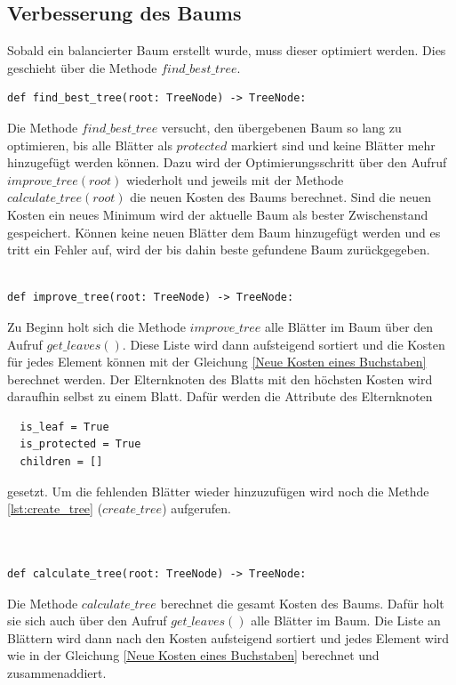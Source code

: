 \documentclass[a4paper,10pt,ngerman]{scrartcl}
\begin{document}
\subsection{Verbesserung des Baums}
Sobald ein balancierter Baum erstellt wurde, muss dieser optimiert werden. Dies geschieht über die Methode $find\_best\_tree$.
\vspace{2em}
\begin{lstlisting}[caption={Methode \texttt{find\_best\_tree}}, label={lst:find_best_tree}]
  def find_best_tree(root: TreeNode) -> TreeNode:
\end{lstlisting}
Die Methode $find\_best\_tree$ versucht, den übergebenen Baum so lang zu optimieren, bis alle Blätter als $protected$ markiert sind und keine Blätter mehr hinzugefügt werden können.
Dazu wird der Optimierungsschritt über den Aufruf $improve\_tree(root)$ wiederholt und jeweils mit der Methode $calculate\_tree(root)$ die neuen Kosten des Baums berechnet.
Sind die neuen Kosten ein neues Minimum wird der aktuelle Baum als bester Zwischenstand gespeichert.
Können keine neuen Blätter dem Baum hinzugefügt werden und es tritt ein Fehler auf, wird der bis dahin beste gefundene Baum zurückgegeben.\\
\\
\vspace{2em}
\begin{lstlisting}[caption={Methode \texttt{imporve\_tree}}, label={lst:imporve_tree}]
  def improve_tree(root: TreeNode) -> TreeNode:
\end{lstlisting}
Zu Beginn holt sich die Methode $improve\_tree$ alle Blätter im Baum über den Aufruf $get\_leaves()$.
Diese Liste wird dann aufsteigend sortiert und die Kosten für jedes Element können mit der Gleichung \eqref{Neue Kosten eines Buchstaben} berechnet werden.
Der Elternknoten des Blatts mit den höchsten Kosten wird daraufhin selbst zu einem Blatt. Dafür werden die Attribute des Elternknoten
\begin{lstlisting}
  is_leaf = True
  is_protected = True
  children = []
\end{lstlisting}
\vspace{-1.5em}
gesetzt. Um die fehlenden Blätter wieder hinzuzufügen wird noch die Methde \ref{lst:create_tree}  ($create\_tree$) aufgerufen.\\
\\\\
\begin{lstlisting}[caption={Methode \texttt{calculate\_tree}}, label={lst:calculate_tree}]
  def calculate_tree(root: TreeNode) -> TreeNode:
\end{lstlisting}
Die Methode $calculate\_tree$ berechnet die gesamt Kosten des Baums. Dafür holt sie sich auch über den Aufruf $get\_leaves()$ alle Blätter im Baum.
Die Liste an Blättern wird dann nach den Kosten aufsteigend sortiert und jedes Element wird wie in der Gleichung \eqref{Neue Kosten eines Buchstaben} berechnet und zusammenaddiert.
\end{document}
